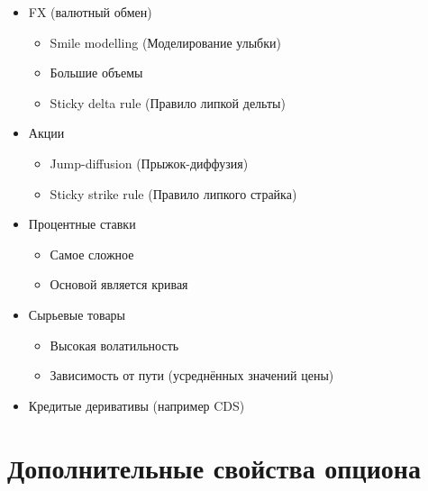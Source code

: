 \documentclass{article}
\begin{document}
\begin{itemize}

  \item FX (валютный обмен)
  
    \begin{itemize}
    \item Smile modelling (Моделирование улыбки)
    \item Большие объемы
    \item Sticky delta rule (Правило липкой дельты)
    \end{itemize}
   
  \item Акции
  
    \begin{itemize}
    \item Jump-diffusion (Прыжок-диффузия)
    \item Sticky strike rule (Правило липкого страйка)
    \end{itemize}
  

  \item Процентные ставки

    \begin{itemize}
    \item Самое сложное
    \item Основой является кривая
    \end{itemize}


  \item Сырьевые товары

    \begin{itemize}
    \item Высокая волатильность
    \item Зависимость от пути (усреднённых значений цены)
    \end{itemize}


  \item Кредитые деривативы (например CDS)
   
\end{itemize}

\section{Дополнительные свойства опциона}
\end{document}
